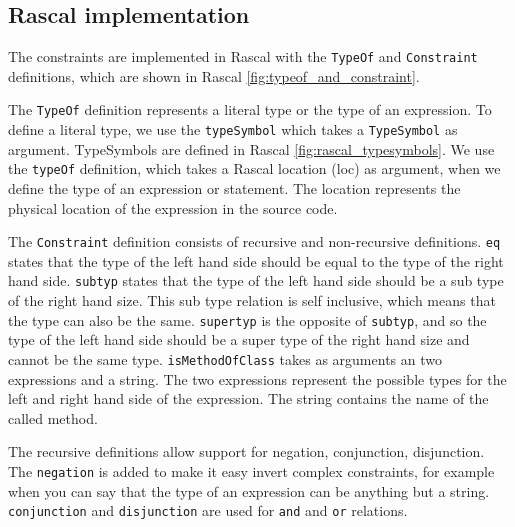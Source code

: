 \documentclass[../main.tex]{subfiles}
\begin{document}
       \subsection{Rascal implementation}
    The constraints are implemented in Rascal with the \texttt{TypeOf} and \texttt{Constraint} definitions, which are shown in Rascal \ref{fig:typeof_and_constraint}.
    
    The \texttt{TypeOf} definition represents a literal type or the type of an expression.
    To define a literal type, we use the \texttt{typeSymbol} which takes a \texttt{TypeSymbol} as argument.
    TypeSymbols are defined in Rascal \ref{fig:rascal_typesymbols}.
    We use the \texttt{typeOf} definition, which takes a Rascal location (loc) as argument, when we define the type of an expression or statement.
    The location represents the physical location of the expression in the source code.
    
    The \texttt{Constraint} definition consists of recursive and non-recursive definitions.
    \texttt{eq} states that the type of the left hand side should be equal to the type of the right hand side.
    \texttt{subtyp} states that the type of the left hand side should be a sub type of the right hand size.
    This sub type relation is self inclusive, which means that the type can also be the same.
    \texttt{supertyp} is the opposite of \texttt{subtyp}, and so the type of the left hand side should be a super type of the right hand size and cannot be the same type.
    \texttt{isMethodOfClass} takes as arguments an two expressions and a string.
    The two expressions represent the possible types for the left and right hand side of the expression.
    The string contains the name of the called method.
    
    The recursive definitions allow support for negation, conjunction, disjunction.
    The \texttt{negation} is added to make it easy invert complex constraints, for example when you can say that the type of an expression can be anything but a string.
    \texttt{conjunction} and \texttt{disjunction} are used for \texttt{and} and \texttt{or} relations.
    
\end{document}
